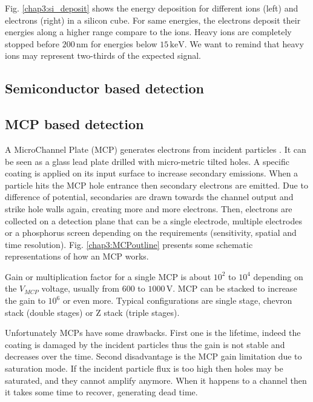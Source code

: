 \begin{refsection}
  
  
  Fig. \ref{chap3:si_deposit} shows the energy deposition for different ions (left) and electrons (right) in a silicon cube. For same energies, the electrons deposit their energies along a higher range compare to the ions. Heavy ions are completely stopped before $200\,\mathrm{nm}$ for energies below $15\,\mathrm{keV}$. We want to remind that heavy ions may represent two-thirds of the expected signal.

	\subsection{Semiconductor based detection}
	\cite[]{Cavalleri1971}
	\cite{Allison2006,Allison2016}\cite{srim2013}
	\subsection{MCP based detection}

	A MicroChannel Plate (MCP) generates electrons from incident particles \cite{Wiza1979}.
	It can be seen as a glass lead plate drilled with micro-metric tilted holes.
	A specific coating is applied on its input surface to increase secondary emissions. When a particle hits the MCP hole entrance then secondary electrons are emitted. Due to difference of potential, secondaries are drawn towards the channel output and strike hole walls again, creating more and more electrons. Then, electrons are collected on a detection plane that can be a single electrode, multiple electrodes or a phosphorus screen depending on the requirements (sensitivity, spatial and time resolution). Fig. \ref{chap3:MCPoutline} presents some schematic representations of how an MCP works.

	

	Gain or multiplication factor for a single MCP is about $10^{2}$ to $10^{4}$ depending on the $V_{MCP}$ voltage, usually from $600$ to $1000\,\mathrm{V}$. MCP can be stacked to increase the gain to $10^{6}$ or even more. Typical configurations are single stage, chevron stack (double stages) or Z stack (triple stages).

	Unfortunately MCPs have some drawbacks. First one is the lifetime, indeed the coating is damaged by the incident particles thus the gain is not stable and decreases over the time. Second disadvantage is the MCP gain limitation due to saturation mode. If the incident particle flux is too high then holes may be saturated, and they cannot amplify anymore. When it happens to a channel then it takes some time to recover, generating dead time.


\end{refsection}
